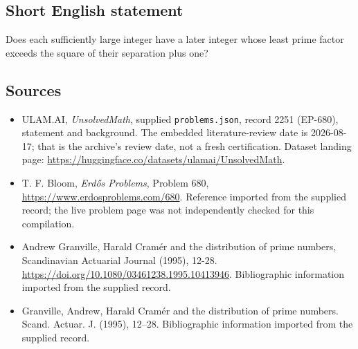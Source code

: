 \documentclass[11pt,a4paper]{article}
\begin{document}
\subsection{Short English statement}

Does each sufficiently large integer have a later integer whose least prime factor exceeds the square of their separation plus one?

\subsection{Sources}

{\small

\begin{itemize}

\item[\hypertarget{source:2251:1}{S1}] ULAM.AI, \emph{UnsolvedMath}, supplied \texttt{problems.json}, record 2251 (EP-680), statement and background. The embedded literature-review date is 2026-08-17; that is the archive’s review date, not a fresh certification. Dataset landing page: \url{https://huggingface.co/datasets/ulamai/UnsolvedMath}.

\item[\hypertarget{source:2251:2}{S2}] T. F. Bloom, \emph{Erdős Problems}, Problem 680, \url{https://www.erdosproblems.com/680}. Reference imported from the supplied record; the live problem page was not independently checked for this compilation.

\item[\hypertarget{source:2251:3}{S3}] Andrew Granville, Harald Cramér and the distribution of prime numbers, Scandinavian Actuarial Journal (1995), 12-28. \url{https://doi.org/10.1080/03461238.1995.10413946}. Bibliographic information imported from the supplied record.

\item[\hypertarget{source:2251:4}{S4}] Granville, Andrew, Harald {C}ram\'{e}r and the distribution of prime numbers. Scand. Actuar. J. (1995), 12--28. Bibliographic information imported from the supplied record.

\end{itemize}

}

\label{end:2251}
\end{document}
